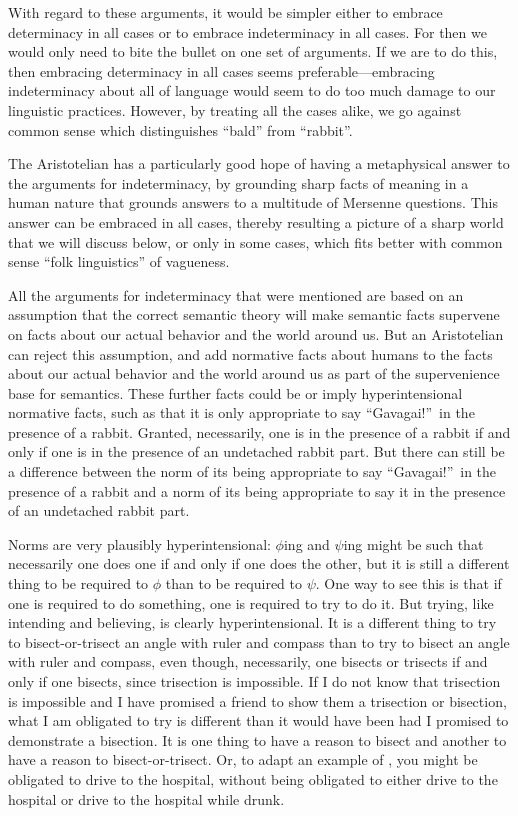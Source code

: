 With regard to these arguments, it would be simpler either to embrace determinacy in all cases or to embrace indeterminacy in all 
cases. For then we would only need to bite the bullet on one set of arguments. If we are to do this, then embracing determinacy in
all cases seems preferable---embracing indeterminacy about all of language would seem to do too much damage to our linguistic practices.
However, by treating all the cases alike, we go against common sense which distinguishes ``bald'' from ``rabbit''. 

The Aristotelian has a particularly good hope of having a metaphysical answer to the arguments for indeterminacy,
by grounding sharp facts of meaning in a human nature that grounds answers to a multitude of Mersenne questions.
This answer can be embraced in all cases, thereby resulting a picture of a sharp world that we will discuss below, 
or only in some cases, which fits better with common sense ``folk linguistics'' of vagueness.

All the arguments for indeterminacy that were mentioned are based on an assumption that the correct semantic theory will make semantic facts supervene on
facts about our actual behavior and the world around us. But an Aristotelian can reject this assumption, and add normative facts about humans 
to the facts about our actual behavior and the world around us as part of the supervenience base for semantics. These further
facts could be or imply hyperintensional normative
facts, such as that it is only appropriate to say ``Gavagai!''\ in the presence of a rabbit. Granted, necessarily, one is in the
presence of a rabbit if and only if one is in the presence of an undetached rabbit part. But there can still be a difference between
the norm of its being appropriate to say ``Gavagai!''\ in the presence of a rabbit and a norm of its being appropriate to say it 
in the presence of an undetached rabbit part.

Norms are very plausibly hyperintensional: $\phi$ing and $\psi$ing might be such that necessarily one does one if and only if one does the other,
but it is still a different thing to be required to $\phi$ than to be required to $\psi$. One way to see this is that if one
is required to do something, one is required to try to do it. But trying, like intending and believing, is clearly hyperintensional.
It is a different thing to try to bisect-or-trisect an angle with ruler and compass than to try to bisect an angle with ruler and 
compass, even though, necessarily, one bisects or trisects if and only if one bisects, since trisection is impossible. If I do not
know that trisection is impossible and I have promised a friend to show them a trisection or bisection, what I am obligated to try
is different than it would have been had I promised to demonstrate a bisection. 
It is one thing to have a reason to bisect and another to have a reason to bisect-or-trisect. Or, to adapt an example of 
, you might be obligated to drive to the hospital, without being obligated to either drive to the hospital or 
drive to the hospital while drunk. 

